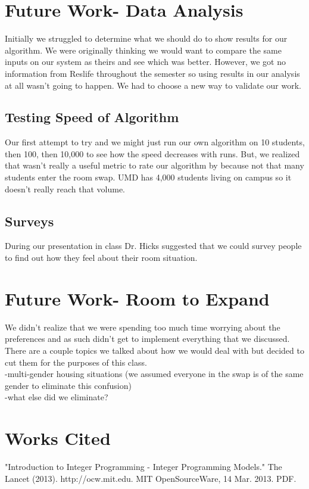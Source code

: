 \documentclass[12pt]{article}
\begin{document}
\section{Future Work- Data Analysis}
Initially we struggled to determine what we should do to show results for our algorithm. We were originally thinking we would want to compare the same inputs on our system as theirs and see which was better. However, we got no information from Reslife throughout the semester so using results in our analysis at all wasn't going to happen. We had to choose a new way to validate our work.

\subsection{Testing Speed of Algorithm}
Our first attempt to try and  we might just run our own algorithm on 10 students, then 100, then 10,000 to see how the speed decreases with runs. But, we realized that wasn't really a useful metric to rate our algorithm by because not that many students enter the room swap. UMD has 4,000 students living on campus so it doesn't really reach that volume.

\subsection{Surveys}
During our presentation in class Dr. Hicks suggested that we could survey people to find out how they feel about their room situation.

\section{Future Work- Room to Expand}
We didn't realize that we were spending too much time worrying about the preferences and as such didn't get to implement everything that we discussed. There are a couple topics we talked about how we would deal with but decided to cut them for the purposes of this class.\\
-multi-gender housing situations (we assumed everyone in the swap is of the same gender to eliminate this confusion)\\
-what else did we eliminate?

\section{Works Cited}
"Introduction to Integer Programming - Integer Programming Models." The Lancet (2013). http://ocw.mit.edu. MIT OpenSourceWare, 14 Mar. 2013. PDF.

%
% 
\end{document}
